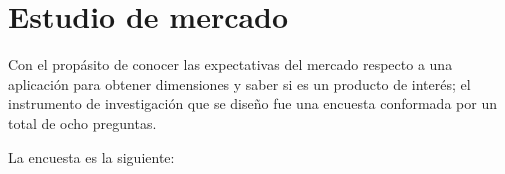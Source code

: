 \section{Estudio de mercado}
Con el propásito de conocer las expectativas del mercado respecto a una aplicación para obtener dimensiones y saber si es un producto de interés; el instrumento de investigación que se diseño fue una encuesta conformada  por un total de ocho preguntas.

La encuesta es la siguiente:

